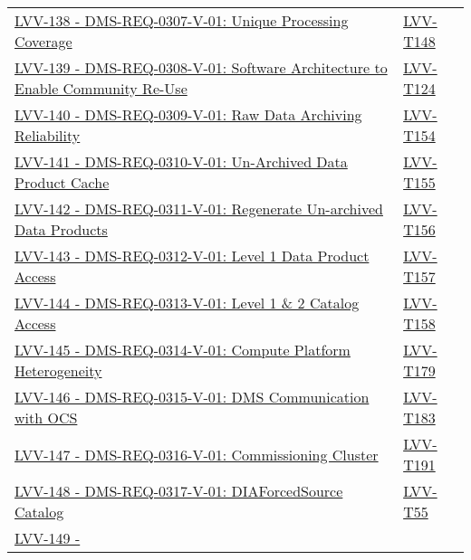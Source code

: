 \begin{longtable}[]{p{13cm}p{3cm}}
\href{https://jira.lsstcorp.org/browse/LVV-138}{LVV-138 -
DMS-REQ-0307-V-01: Unique Processing Coverage} &
\protect\hyperlink{lvv-t148---verify-implementation-of-unique-processing-coverage-dms-req-0307}{LVV-T148}\tabularnewline
\href{https://jira.lsstcorp.org/browse/LVV-139}{LVV-139 -
DMS-REQ-0308-V-01: Software Architecture to Enable Community Re-Use} &
\protect\hyperlink{lvv-t124---verify-implementation-of--software-architecture-to-enable-community-re-use-dms-req-0308}{LVV-T124}\tabularnewline
\href{https://jira.lsstcorp.org/browse/LVV-140}{LVV-140 -
DMS-REQ-0309-V-01: Raw Data Archiving Reliability} &
\protect\hyperlink{lvv-t154---verify-implementation-of-raw-data-archiving-reliability-dms-req-0309}{LVV-T154}\tabularnewline
\href{https://jira.lsstcorp.org/browse/LVV-141}{LVV-141 -
DMS-REQ-0310-V-01: Un-Archived Data Product Cache} &
\protect\hyperlink{lvv-t155---verify-implementation-of-un-archived-data-product-cache-dms-req-0310}{LVV-T155}\tabularnewline
\href{https://jira.lsstcorp.org/browse/LVV-142}{LVV-142 -
DMS-REQ-0311-V-01: Regenerate Un-archived Data Products} &
\protect\hyperlink{lvv-t156---verify-implementation-of-regenerate-un-archived-data-products-dms-req-0311}{LVV-T156}\tabularnewline
\href{https://jira.lsstcorp.org/browse/LVV-143}{LVV-143 -
DMS-REQ-0312-V-01: Level 1 Data Product Access} &
\protect\hyperlink{lvv-t157---verify-implementation-level-1-data-product-access-dms-req-0312}{LVV-T157}\tabularnewline
\href{https://jira.lsstcorp.org/browse/LVV-144}{LVV-144 -
DMS-REQ-0313-V-01: Level 1 \& 2 Catalog Access} &
\protect\hyperlink{lvv-t158---verify-implementation-level-1-and-2-catalog-access-dms-req-0313}{LVV-T158}\tabularnewline
\href{https://jira.lsstcorp.org/browse/LVV-145}{LVV-145 -
DMS-REQ-0314-V-01: Compute Platform Heterogeneity} &
\protect\hyperlink{lvv-t179---verify-implementation-of-compute-platform-heterogeneity-dms-req-0314}{LVV-T179}\tabularnewline
\href{https://jira.lsstcorp.org/browse/LVV-146}{LVV-146 -
DMS-REQ-0315-V-01: DMS Communication with OCS} &
\protect\hyperlink{lvv-t183---verify-implementation-dms-communication-with-ocs-dms-req-0315}{LVV-T183}\tabularnewline
\href{https://jira.lsstcorp.org/browse/LVV-147}{LVV-147 -
DMS-REQ-0316-V-01: Commissioning Cluster} &
\protect\hyperlink{lvv-t191---verify-implementation-of-commissioning-cluster-dms-req-0316}{LVV-T191}\tabularnewline
\href{https://jira.lsstcorp.org/browse/LVV-148}{LVV-148 -
DMS-REQ-0317-V-01: DIAForcedSource Catalog} &
\protect\hyperlink{lvv-t55---verify-implementation-of-diaforcedsource-catalog-dms-req-0317}{LVV-T55}\tabularnewline
\href{https://jira.lsstcorp.org/browse/LVV-149}{LVV-149 -
}
\end{longtable}
